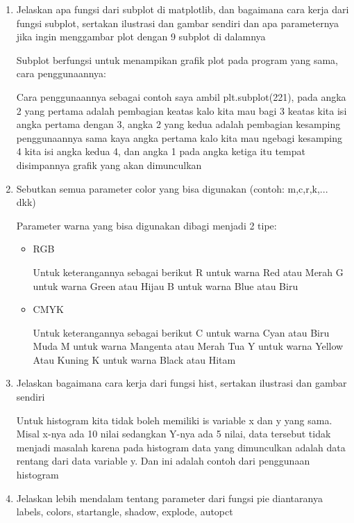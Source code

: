 \begin{enumerate}
\item Jelaskan apa fungsi dari subplot di matplotlib, dan bagaimana cara kerja dari fungsi subplot, sertakan ilustrasi dan gambar sendiri dan apa parameternya jika ingin menggambar plot dengan 9 subplot di dalamnya

	Subplot berfungsi untuk menampikan grafik plot pada program yang sama, cara penggunaannya:

Cara penggunaannya sebagai contoh saya ambil plt.subplot(221), pada angka 2 yang pertama adalah pembagian keatas kalo kita mau bagi 3 keatas kita isi angka pertama dengan 3, angka 2 yang kedua adalah pembagian kesamping penggunaannya sama kaya angka pertama kalo kita mau ngebagi kesamping 4 kita isi angka kedua 4, dan angka 1 pada angka ketiga itu tempat disimpannya grafik yang akan dimunculkan

\item Sebutkan semua parameter color yang bisa digunakan (contoh: m,c,r,k,... dkk)

	Parameter warna yang bisa digunakan dibagi menjadi 2 tipe:
\begin{itemize}
	\item RGB
	
	Untuk keterangannya sebagai berikut
    R untuk warna Red atau Merah
    G untuk warna Green atau Hijau
    B untuk warna Blue atau Biru
    
    \item CMYK
    
    Untuk keterangannya sebagai berikut
    C untuk warna Cyan atau Biru Muda
    M untuk warna Mangenta atau Merah Tua
    Y untuk warna Yellow Atau Kuning
    K untuk warna Black atau Hitam
\end{itemize}

\item Jelaskan bagaimana cara kerja dari fungsi hist, sertakan ilustrasi dan gambar sendiri

	Untuk histogram kita tidak boleh memiliki is variable x dan y yang sama. Misal x-nya ada 10 nilai sedangkan Y-nya ada 5 nilai, data tersebut tidak menjadi masalah karena pada histogram data yang dimunculkan adalah data rentang dari data variable y. Dan ini adalah contoh dari penggunaan histogram


\item Jelaskan lebih mendalam tentang parameter dari fungsi pie diantaranya labels, colors, startangle, shadow, explode, autopct


\end{enumerate}
